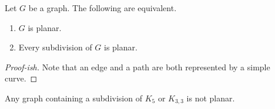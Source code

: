 \documentclass[co342]{subfiles}
\begin{document}
    \begin{prop}{}
        Let $G$ be a graph. The following are equivalent.
        \begin{enumerate}
            \item $G$ is planar.
            \item Every subdivision of $G$ is planar.
        \end{enumerate}
    \end{prop}

    \begin{proof}[Proof-ish]
        Note that an edge and a path are both represented by a simple curve.
    \end{proof}

    \clearpage
    \begin{cor}{}
        Any graph containing a subdivision of $K_5$ or $K_{3,3}$ is not planar.
    \end{cor}	
    
    
    
    
    
    
    
    
    
    
    
    
    
    
    
    
    
    
    
    
    
    
    
    
    
    
    
    
    
    
    
    
    
    
    
    
    
    
    
    
    
    
\end{document}
